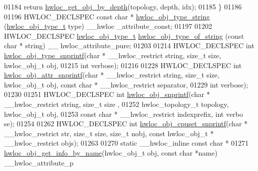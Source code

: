 \begin{DoxyCode}
01184   \textcolor{keywordflow}{return} \hyperlink{a00047_gaedd78240b0c1108355586a268ec5a697}{hwloc_get_obj_by_depth}(topology, depth, idx);
01185 \}
01186 
01196 HWLOC\_DECLSPEC \textcolor{keyword}{const} \textcolor{keywordtype}{char} * \hyperlink{a00048_ga7c61920feca6fd9006d930dabfc09058}{hwloc_obj_type_string} (\hyperlink{a00041_gacd37bb612667dc437d66bfb175a8dc55}{hwloc_obj_type_t} type) \_\_hwloc
      \_attribute\_const;
01197 
01202 HWLOC\_DECLSPEC \hyperlink{a00041_gacd37bb612667dc437d66bfb175a8dc55}{hwloc_obj_type_t} \hyperlink{a00048_gade722091ae392fdc79557e797a16c370}{hwloc_obj_type_of_string} (\textcolor{keyword}{const} \textcolor{keywordtype}{char} * \textcolor{keywordtype}{string}) \_\_
      hwloc\_attribute\_pure;
01203 
01214 HWLOC\_DECLSPEC \textcolor{keywordtype}{int} \hyperlink{a00048_ga3ad856e8f3487d340c82a23b8a2a0351}{hwloc_obj_type_snprintf}(\textcolor{keywordtype}{char} * \_\_hwloc\_restrict \textcolor{keywordtype}{string}, \textcolor{keywordtype}{size\_t
      } size, hwloc\_obj\_t obj,
01215                                    \textcolor{keywordtype}{int} verbose);
01216 
01228 HWLOC\_DECLSPEC \textcolor{keywordtype}{int} \hyperlink{a00048_ga0db8286d7f3ceda8defd76e3e1e2b284}{hwloc_obj_attr_snprintf}(\textcolor{keywordtype}{char} * \_\_hwloc\_restrict \textcolor{keywordtype}{string}, \textcolor{keywordtype}{size\_t
      } size, hwloc\_obj\_t obj, \textcolor{keyword}{const} \textcolor{keywordtype}{char} * \_\_hwloc\_restrict separator,
01229                                    \textcolor{keywordtype}{int} verbose);
01230 
01251 HWLOC\_DECLSPEC \textcolor{keywordtype}{int} \hyperlink{a00048_ga5c6a61a83f4790b421e2f62e9088446f}{hwloc_obj_snprintf}(\textcolor{keywordtype}{char} * \_\_hwloc\_restrict \textcolor{keywordtype}{string}, \textcolor{keywordtype}{size\_t} size
      ,
01252                              hwloc\_topology\_t topology, hwloc\_obj\_t obj,
01253                              \textcolor{keyword}{const} \textcolor{keywordtype}{char} * \_\_hwloc\_restrict indexprefix, \textcolor{keywordtype}{int} verbo
      se);
01254 
01262 HWLOC\_DECLSPEC \textcolor{keywordtype}{int} \hyperlink{a00048_gabbfb92224c992c0e2ecef6b6e45260f2}{hwloc_obj_cpuset_snprintf}(\textcolor{keywordtype}{char} * \_\_hwloc\_restrict str, \textcolor{keywordtype}{size\_t} 
      size, \textcolor{keywordtype}{size\_t} nobj, \textcolor{keyword}{const} hwloc\_obj\_t * \_\_hwloc\_restrict objs);
01263 
01270 \textcolor{keyword}{static} \_\_hwloc\_inline \textcolor{keyword}{const} \textcolor{keywordtype}{char} *
01271 \hyperlink{a00048_ga2a12b2450489675bd5759dc47cbc51ed}{hwloc_obj_get_info_by_name}(hwloc\_obj\_t obj, \textcolor{keyword}{const} \textcolor{keywordtype}{char} *name) \_\_hwloc\_attribute\_p

\end{DoxyCode}
